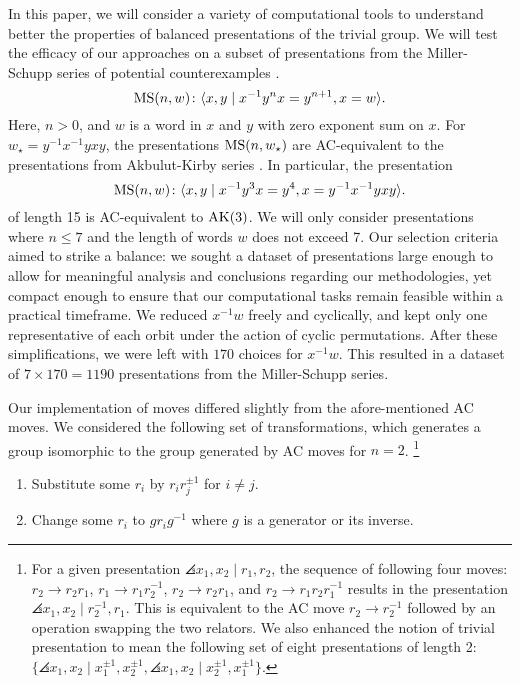 In this paper, we will consider a variety of computational tools to understand better the properties of balanced presentations of the trivial group. We will test the efficacy of our approaches on a subset of presentations from the Miller-Schupp series of potential counterexamples \cite{Miller-Schupp}.
\[
\text{MS}(n, w) \colon \langle x, y \mid x^{-1} y^n x = y^{n+1}, x = w\rangle.
\]
Here, $n > 0$, and $w$ is a word in $x$ and $y$ with zero exponent sum on $x$. For $w_\star = y^{-1} x^{-1} y x y$, the presentations $\text{MS}(n, w_\star)$ are AC-equivalent to the presentations from Akbulut-Kirby series \cite{MMS}. In particular, the presentation
\[
\text{MS}(n, w) \colon \langle x, y \mid x^{-1} y^3 x = y^{4}, x =  y^{-1} x^{-1} y x y\rangle.
\]
of length 15 is AC-equivalent to $\text{AK}(3)$. We will only consider presentations where $n \leq 7$ and the length of words $w$ does not exceed 7.
Our selection criteria aimed to strike a balance: we sought a dataset of presentations large enough to allow for meaningful analysis and conclusions regarding our methodologies, yet compact enough to ensure that our computational tasks remain feasible within a practical timeframe.
We reduced $x^{-1}w$ freely and cyclically, and kept only one representative of each orbit under the action of cyclic permutations. After these simplifications, we were left with $170$ choices for $x^{-1} w$. This resulted in a dataset of $7 \times 170 = 1190$ presentations from the Miller-Schupp series.
\newline

Our implementation of moves differed slightly from the afore-mentioned AC moves.  We considered the following set of transformations, which generates a group isomorphic to the group generated by AC moves for $n=2$.
\footnote{For a given presentation $\angles{x_1, x_2 \mid r_1, r_2}$, the sequence of following four moves: $r_2 \to r_2 r_1$, $r_1 \to r_1 r_2^{-1}$, $r_2 \to r_2 r_1$, and $r_2 \to r_1 r_2 r_1^{-1}$ results in the presentation $\angles{x_1, x_2 \mid r_2^{-1}, r_1}$. This is equivalent to the AC move $r_2 \to r_2^{-1}$ followed by an operation swapping the two relators. We also enhanced the notion of trivial presentation to mean the following set of eight presentations of length 2: $\{\angles{x_1, x_2 \mid x_1^{\pm 1}, x_2^{\pm 1}} , \angles{x_1, x_2 \mid x_2^{\pm 1}, x_1^{\pm 1}}  \}$.}
\begin{enumerate}
	\item Substitute some $r_i$ by $r_i r_j^{\pm 1}$ for $i \neq j$.
	\item Change some $r_i$ to $g r_i g^{-1}$ where $g$ is a generator or its inverse.
\end{enumerate}

